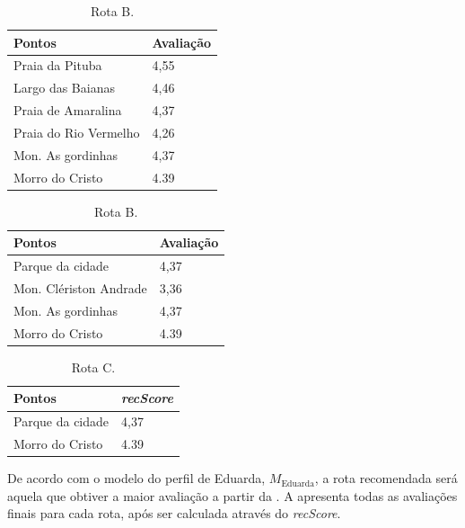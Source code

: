 \documentclass[portuguese]{textolivre}
\begin{document}

\begin{table}
\parbox[t]{.45\linewidth}{
\centering
\begin{threeparttable}
\caption{Rota A.}\label{tab01}
\begin{tabular}{ll} 
\toprule
Pontos & Avaliação \\  
\midrule   
Praia da Pituba & 4,55 \\
Largo das Baianas & 4,46 \\
Praia de Amaralina & 4,37\\
Praia do Rio Vermelho &  4,26 \\
Mon. As gordinhas & 4,37 \\
Morro do Cristo & 4.39 \\ 
\bottomrule
\end{tabular}
\end{threeparttable}
}
\hfill
\parbox[t]{.45\linewidth}{
\centering
\begin{threeparttable}
\caption{Rota B.} \label{tab02}
\begin{tabular}{ll} 
\toprule
Pontos & Avaliação \\ 
\midrule
Parque da cidade & 4,37 \\
Mon. Clériston Andrade & 3,36 \\
Mon. As gordinhas & 4,37 \\
Morro do Cristo & 4.39 \\ 
\bottomrule
\end{tabular}
\end{threeparttable}
}
\end{table}


\begin{table}[h!]
\centering
\begin{threeparttable}
\caption{Rota C.}
\label{tab:table3}
\begin{tabular}{ll} 
\toprule
Pontos & \textit{recScore} \\ 
\midrule
Parque da cidade & 4,37 \\
Morro do Cristo & 4.39 \\ 
\bottomrule
\end{tabular}
\end{threeparttable}
\end{table}

De acordo com o modelo do perfil de Eduarda, $M_{\text{Eduarda}}$, a rota recomendada será aquela que obtiver a maior avaliação a partir da . A  apresenta todas as avaliações finais para cada rota, após ser calculada através do \textit{recScore}.
\end{document}
